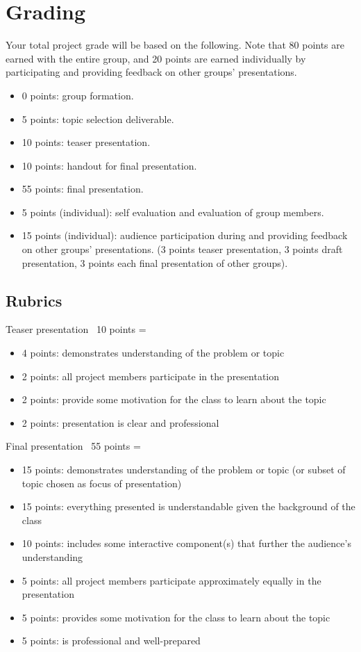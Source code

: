 \documentclass[11pt]{article}
\begin{document}
\section{Grading}
Your total project grade will be based on the following. Note that 80 points are 
earned with the entire group, and 20 points are earned individually by participating
and providing feedback on other groups' presentations.
\begin{itemize}
    \item 0 points: group formation.
    \item 5 points: topic selection deliverable.
    \item 10 points: teaser presentation.
    \item 10 points: handout for final presentation.
    \item 55 points: final presentation. 
    \item 5 points (individual): self evaluation and evaluation of group members.
    \item 15 points (individual): audience participation during and providing feedback on other groups' presentations. (3 points teaser presentation,
    3 points draft presentation, 3 points each final presentation of other groups).
\end{itemize}

\subsection{Rubrics}

\begin{Rubric}{Teaser presentation}~
    10 points = 
	\begin{itemize}
\item 4 points: demonstrates understanding of the problem or topic 
\item 2 points: all project members participate in the presentation
\item 2 points: provide some motivation for the class to learn about the topic
\item 2 points: presentation is clear and professional
	\end{itemize}
\end{Rubric}

\begin{Rubric}{Final presentation}~
    55 points = 
    \begin{itemize}
\item 15 points: demonstrates understanding of the problem or topic (or subset of topic
chosen as focus of presentation)
\item 15 points: everything presented is understandable given the background of the class
\item 10 points: includes some interactive component(s) that further the audience's understanding
\item 5 points: all project members participate approximately equally in the presentation
\item 5 points: provides some motivation for the class to learn about the topic
\item 5 points: is professional and well-prepared
    \end{itemize}
\end{Rubric}
\end{document}
